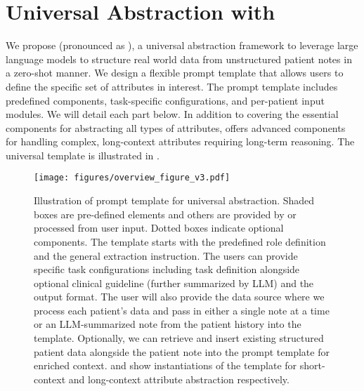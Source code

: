 \section{Universal Abstraction with \ours}

We propose \ours (pronounced as \textipa{~["u:ma"]}), a universal abstraction framework to leverage large language models to structure real world data from unstructured patient notes in a zero-shot manner. We design a flexible prompt template that allows users to define the specific set of attributes in interest. The prompt template includes predefined components, task-specific configurations, and per-patient input modules. We will detail each part below. In addition to covering the essential components for abstracting all types of attributes, \ours offers advanced components for handling complex, long-context attributes requiring long-term reasoning. The universal template is illustrated in . 



\begin{figure}[t!]
\centering
\texttt{[image: figures/overview\_figure\_v3.pdf]}
\caption{Illustration of \ours prompt template for universal abstraction. Shaded boxes are pre-defined elements and others are provided by or processed from user input. Dotted boxes indicate optional components. The template starts with the predefined role definition and the general extraction instruction. The users can provide specific task configurations including task definition alongside optional clinical guideline (further summarized by \ac{LLM}) and the output format. The user will also provide the data source where we process each patient's data and pass in either a single note at a time or an \ac{LLM}-summarized note from the patient history into the template. Optionally, we can retrieve and insert existing structured patient data alongside the patient note into the prompt template for enriched context.  and  show instantiations of the template for short-context and long-context attribute abstraction respectively. }
\label{fig:gpt-universal-prompt-template}
\end{figure}

